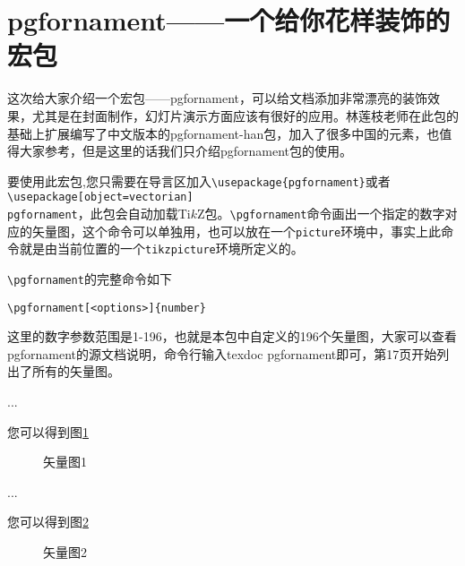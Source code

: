 \documentclass{ctexbook}
\begin{document}
\chapter*{pgfornament——一个给你花样装饰的宏包}
这次给大家介绍一个宏包——pgfornament，可以给文档添加非常漂亮的装饰效果，尤其是在封面制作，幻灯片演示方面应该有很好的应用。林莲枝老师在此包的基础上扩展编写了中文版本的pgfornament-han包，加入了很多中国的元素，也值得大家参考，但是这里的话我们只介绍pgfornament包的使用。

要使用此宏包,您只需要在导言区加入\verb|\usepackage{pgfornament}|或者\verb|\usepackage[object=vectorian]|\\
\texttt{{pgfornament}}，此包会自动加载Ti$k$Z包。\verb|\pgfornament|命令画出一个指定的数字对应的矢量图，这个命令可以单独用，也可以放在一个\verb|picture|环境中，事实上此命令就是由当前位置的一个\verb|tikzpicture|环境所定义的。

\verb|\pgfornament|的完整命令如下
\begin{verbatim}
\pgfornament[<options>]{number}
\end{verbatim}

这里的数字参数范围是1-196，也就是本包中自定义的196个矢量图，大家可以查看pgfornament的源文档说明，命令行输入texdoc pgfornament即可，第17页开始列出了所有的矢量图。\\
\begin{minipage}{0.6\textwidth}
\begin{tkzexample}[code only,width=5cm,small]
  \usepackage{ornament}
  ...
\end{tkzexample}
您可以得到图\ref{fig:o1}
\end{minipage}
\begin{minipage}{0.4\textwidth}
\begin{figure}[H]
 \begin{center}
\end{center}
  \caption{矢量图1}
  \label{fig:o1}
\end{figure}
\end{minipage}
\begin{minipage}{0.6\textwidth}
\begin{tkzexample}[code only,width=5cm,small]
  \usepackage{ornament}
  ...
\end{tkzexample}
您可以得到图\ref{fig:o2}
\end{minipage}
\begin{minipage}{0.4\textwidth}
\begin{figure}[H]
 \begin{center}
\end{center}
  \caption{矢量图2}
  \label{fig:o2}
\end{figure}
\end{minipage}
\end{document}
